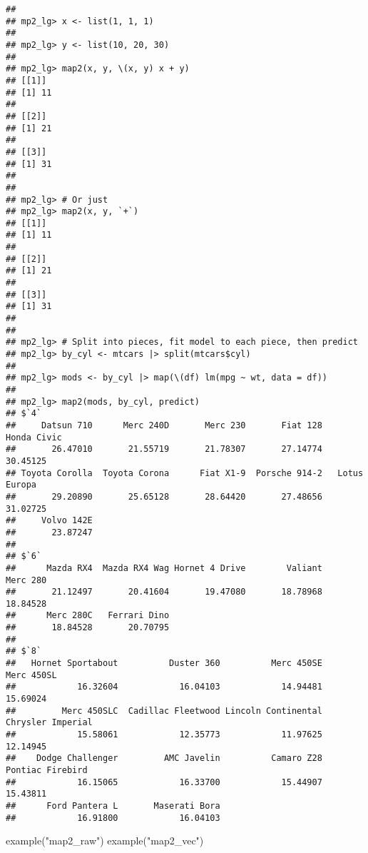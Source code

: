 \documentclass[
]{book}
\newenvironment{Shaded}{\begin{snugshade}}{\end{snugshade}}
\newcommand{\FunctionTok}[1]{\textcolor[rgb]{0.00,0.00,0.00}{#1}}
\newcommand{\NormalTok}[1]{#1}
\newcommand{\StringTok}[1]{\textcolor[rgb]{0.31,0.60,0.02}{#1}}
\begin{document}
\begin{verbatim}
## 
## mp2_lg> x <- list(1, 1, 1)
## 
## mp2_lg> y <- list(10, 20, 30)
## 
## mp2_lg> map2(x, y, \(x, y) x + y)
## [[1]]
## [1] 11
## 
## [[2]]
## [1] 21
## 
## [[3]]
## [1] 31
## 
## 
## mp2_lg> # Or just
## mp2_lg> map2(x, y, `+`)
## [[1]]
## [1] 11
## 
## [[2]]
## [1] 21
## 
## [[3]]
## [1] 31
## 
## 
## mp2_lg> # Split into pieces, fit model to each piece, then predict
## mp2_lg> by_cyl <- mtcars |> split(mtcars$cyl)
## 
## mp2_lg> mods <- by_cyl |> map(\(df) lm(mpg ~ wt, data = df))
## 
## mp2_lg> map2(mods, by_cyl, predict)
## $`4`
##     Datsun 710      Merc 240D       Merc 230       Fiat 128    Honda Civic 
##       26.47010       21.55719       21.78307       27.14774       30.45125 
## Toyota Corolla  Toyota Corona      Fiat X1-9  Porsche 914-2   Lotus Europa 
##       29.20890       25.65128       28.64420       27.48656       31.02725 
##     Volvo 142E 
##       23.87247 
## 
## $`6`
##      Mazda RX4  Mazda RX4 Wag Hornet 4 Drive        Valiant       Merc 280 
##       21.12497       20.41604       19.47080       18.78968       18.84528 
##      Merc 280C   Ferrari Dino 
##       18.84528       20.70795 
## 
## $`8`
##   Hornet Sportabout          Duster 360          Merc 450SE          Merc 450SL 
##            16.32604            16.04103            14.94481            15.69024 
##         Merc 450SLC  Cadillac Fleetwood Lincoln Continental   Chrysler Imperial 
##            15.58061            12.35773            11.97625            12.14945 
##    Dodge Challenger         AMC Javelin          Camaro Z28    Pontiac Firebird 
##            16.15065            16.33700            15.44907            15.43811 
##      Ford Pantera L       Maserati Bora 
##            16.91800            16.04103
\end{verbatim}

\begin{Shaded}
\begin{Highlighting}[]
\FunctionTok{example}\NormalTok{(}\StringTok{"map2\_raw"}\NormalTok{)}
\FunctionTok{example}\NormalTok{(}\StringTok{"map2\_vec"}\NormalTok{)}
\end{Highlighting}
\end{Shaded}
\end{document}
